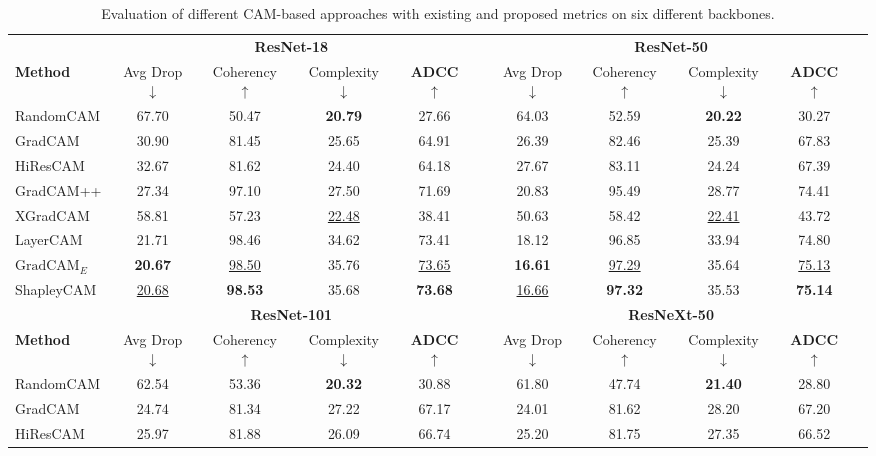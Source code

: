 \begin{table*}[htbp]
\small
\setlength{\tabcolsep}{.25em}
\centering
\caption{Evaluation of different CAM-based approaches with existing and proposed metrics on six different backbones.}
\label{tab:results}
\begin{tabular}{l cccc c cccc c}
\hline
& \multicolumn{4}{c}{\textbf{ResNet-18}} & & \multicolumn{4}{c}{\textbf{ResNet-50}} \\
\cline{2-5} \cline{7-10}
\textbf{Method} & Avg Drop $\downarrow$ & Coherency $\uparrow$ & Complexity $\downarrow$ & \textbf{ADCC} $\uparrow$ & & Avg Drop $\downarrow$ & Coherency $\uparrow$ & Complexity $\downarrow$ & \textbf{ADCC} $\uparrow$ \\
\hline
RandomCAM & 67.70 & 50.47 & \textbf{20.79} & 27.66 & & 64.03 & 52.59 & \textbf{20.22} & 30.27 \\
GradCAM & 30.90 & 81.45 & 25.65 & 64.91 & & 26.39 & 82.46 & 25.39 & 67.83 \\
HiResCAM & 32.67 & 81.62 & 24.40 & 64.18 & & 27.67 & 83.11 & 24.24 & 67.39 \\
GradCAM++ & 27.34 & 97.10 & 27.50 & 71.69 & & 20.83 & 95.49 & 28.77 & 74.41 \\
XGradCAM & 58.81 & 57.23 & \underline{22.48} & 38.41 & & 50.63 & 58.42 & \underline{22.41} & 43.72 \\
LayerCAM & 21.71 & 98.46 & 34.62 & 73.41 & & 18.12 & 96.85 & 33.94 & 74.80 \\
$\text{GradCAM}_{E}$ & \textbf{20.67} & \underline{98.50} & 35.76 & \underline{73.65} & & \textbf{16.61} & \underline{97.29} & 35.64 & \underline{75.13} \\
ShapleyCAM & \underline{20.68} & \textbf{98.53} & 35.68 & \textbf{73.68} & & \underline{16.66} & \textbf{97.32} & 35.53 & \textbf{75.14} \\
\hline
& \multicolumn{4}{c}{\textbf{ResNet-101}} & & \multicolumn{4}{c}{\textbf{ResNeXt-50}} \\
\cline{2-5} \cline{7-10}
\textbf{Method} & Avg Drop $\downarrow$ & Coherency $\uparrow$ & Complexity $\downarrow$ & \textbf{ADCC} $\uparrow$ & & Avg Drop $\downarrow$ & Coherency $\uparrow$ & Complexity $\downarrow$ & \textbf{ADCC} $\uparrow$ \\
\hline
RandomCAM & 62.54 & 53.36 & \textbf{20.32} & 30.88 & & 61.80 & 47.74 & \textbf{21.40} & 28.80 \\
GradCAM & 24.74 & 81.34 & 27.22 & 67.17 & & 24.01 & 81.62 & 28.20 & 67.20 \\
HiResCAM & 25.97 & 81.88 & 26.09 & 66.74 & & 25.20 & 81.75 & 27.35 & 66.52 \\

\end{tabular}
\end{table*}
